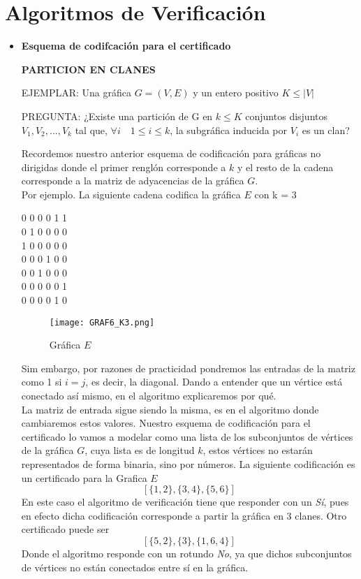 \documentclass[12pt,letterpaper]{article}
\begin{document}
\section*{Algoritmos de Verificación}

\begin{itemize}
    \item \textbf{Esquema de codifcación para el certificado}
    
    \textbf{PARTICION EN CLANES}

    EJEMPLAR: Una gráfica $G = (V, E)$ y un entero positivo $K \leq |V |$
    
    PREGUNTA: ¿Existe una partición de G en $k \leq K$ conjuntos disjuntos $V_1, V_2, ... , V_k$ tal que, $\forall i\quad 1 \leq i \leq k$, la subgráfica inducida por $V_i$ es un clan?

    Recordemos nuestro anterior esquema de codificación para gráficas no dirigidas donde el primer renglón corresponde a $k$ y el resto de la cadena corresponde a la matriz de adyacencias de la gráfica $G$.\\Por ejemplo. La siguiente cadena codifica la gráfica $E$ con k = $3$
    \begin{center}
    0 0 0 0 1 1 \\
    0 1 0 0 0 0 \\
    1 0 0 0 0 0 \\
    0 0 0 1 0 0 \\
    0 0 1 0 0 0 \\
    0 0 0 0 0 1 \\
    0 0 0 0 1 0 \\
    \end{center}
    \begin{figure}[htb]
        \centering
        \texttt{[image: GRAF6\_K3.png]}
        \caption{Gráfica $E$}
    \end{figure}
    
    Sim embargo, por razones de practicidad pondremos las entradas de la matriz como 1 si $i = j$, es decir, la diagonal. Dando a entender que un vértice está conectado así mismo, en el algoritmo explicaremos por qué.\\La matriz de entrada sigue siendo la misma, es en el algoritmo donde cambiaremos estos valores.
    \newpage
    Nuestro esquema de codificación para el certificado lo vamos a modelar como una lista de los subconjuntos de vértices de la gráfica $G$, cuya lista es de longitud $k$, estos vértices no estarán representados de forma binaria, sino por números. La siguiente codificación es un certificado para la Grafica $E$
    $$[\{1,2\},\{3,4\},\{5,6\}]$$
    En este caso el algoritmo de verificación tiene que responder con un \textit{Sí}, pues en efecto dicha codificación corresponde a partir la gráfica en 3 clanes. Otro certificado puede ser
    $$[\{5,2\},\{3\},\{1,6,4\}]$$
    Donde el algoritmo responde con un rotundo \textit{No}, ya que dichos subconjuntos de vértices no están conectados entre sí en la gráfica.
    

\end{itemize}
\end{document}
